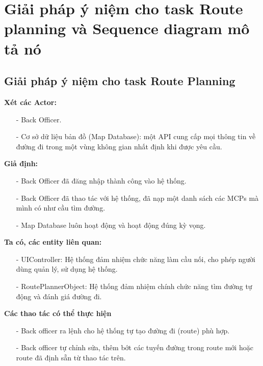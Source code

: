 \section{Giải pháp ý niệm cho task Route planning và Sequence diagram mô tả nó}
    \subsection{Giải pháp ý niệm cho task Route Planning}
        \textbf{Xét các Actor: }
    
        \begin{itemize}
            \item[-] Back Officer.
            \item[-] Cơ sở dữ liệu bản đồ (Map Database): một API cung cấp mọi thông tin về đường đi trong một vùng không gian nhất định khi được yêu cầu.
        \end{itemize}
    
        \textbf{Giả định:}
    
        \begin{itemize}
            \item[-] Back Officer đã đăng nhập thành công vào hệ thống.
            \item[-] Back Officer đã thao tác với hệ thống, đã nạp một danh sách các MCPs mà mình có như cầu tìm đường.
            \item[-] Map Database luôn hoạt động và hoạt động đúng kỳ vọng.
        \end{itemize}
    
        \textbf{Ta có, các entity liên quan:}
    
        \begin{itemize}
            \item[-] UIController: Hệ thống đảm nhiệm chức năng làm cầu nối, cho phép người dùng quản lý, sử dụng hệ thống.
            \item[-] RoutePlannerObject: Hệ thống đảm nhiệm chính chức năng tìm đường tự động và đánh giá đường đi.
        \end{itemize}
    
        \textbf{Các thao tác có thể thực hiện}
    
        \begin{itemize}
            \item[-] Back officer ra lệnh cho hệ thống tự tạo đường đi (route) phù hợp.
            \item[-] Back officer tự chỉnh sửa, thêm bớt các tuyến đường trong route mới hoặc route đã định sẵn từ thao tác trên.
        \end{itemize}
    
